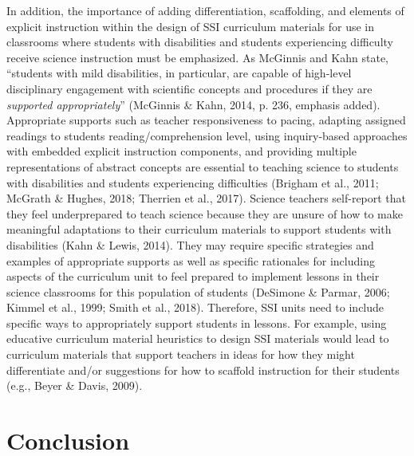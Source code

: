 \documentclass[11.5pt]{sig-alternate}
\begin{document}
\begin{large}
In addition, the importance of adding differentiation, scaffolding, and elements of explicit instruction within the design of SSI curriculum materials for use in classrooms where students with disabilities and students experiencing difficulty receive science instruction must be emphasized. As McGinnis and Kahn state, “students with mild disabilities, in particular, are capable of high-level disciplinary engagement with scientific concepts and procedures if they are \textit{supported appropriately}” (McGinnis \& Kahn, 2014, p. 236, emphasis added). Appropriate supports such as teacher responsiveness to pacing, adapting assigned readings to students reading/comprehension level, using inquiry-based approaches with embedded explicit instruction components, and providing multiple representations of abstract concepts are essential to teaching science to students with disabilities and students experiencing difficulties (Brigham et al., 2011; McGrath \& Hughes, 2018; Therrien et al., 2017). Science teachers self-report that they feel underprepared to teach science because they are unsure of how to make meaningful adaptations to their curriculum materials to support students with disabilities (Kahn \& Lewis, 2014). They may require specific strategies and examples of appropriate supports as well as specific rationales for including aspects of the curriculum unit to feel prepared to implement lessons in their science classrooms for this population of students (DeSimone \& Parmar, 2006; Kimmel et al., 1999; Smith et al., 2018). Therefore, SSI units need to include specific ways to appropriately support students in lessons. For example, using educative curriculum material heuristics to design SSI materials would lead to curriculum materials that support teachers in ideas for how they might differentiate and/or suggestions for how to scaffold instruction for their students (e.g., Beyer \& Davis, 2009).

\section*{Conclusion}


\end{large}
\end{document}
